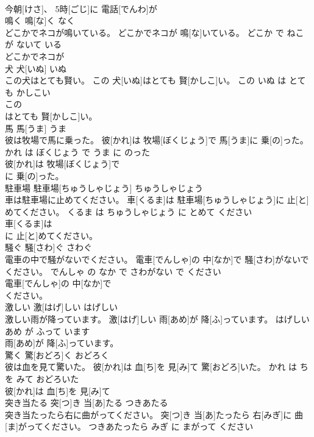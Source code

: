 \documentclass[8pt]{extreport}
\begin{document}
\begin{CJK}{UTF8}{min}
\\	今朝[けさ]、 5時[ごじ]に 電話[でんわ]が
\\	鳴く	鳴[な]く	なく	
\\	どこかでネコが鳴いている。	どこかでネコが 鳴[な]いている。	どこか で ねこ が ないて いる	
\\	どこかでネコが
\\	犬	犬[いぬ]	いぬ	
\\	この犬はとても賢い。	この 犬[いぬ]はとても 賢[かしこ]い。	この いぬ は とても かしこい	
\\	この
\\	はとても 賢[かしこ]い。			
\\	馬	馬[うま]	うま	
\\	彼は牧場で馬に乗った。	彼[かれ]は 牧場[ぼくじょう]で 馬[うま]に 乗[の]った。	かれ は ぼくじょう で うま に のった	
\\	彼[かれ]は 牧場[ぼくじょう]で
\\	に 乗[の]った。			
\\	駐車場	駐車場[ちゅうしゃじょう]	ちゅうしゃじょう	
\\	車は駐車場に止めてください。	車[くるま]は 駐車場[ちゅうしゃじょう]に 止[と]めてください。	くるま は ちゅうしゃじょう に とめて ください	
\\	車[くるま]は
\\	に 止[と]めてください。			
\\	騒ぐ	騒[さわ]ぐ	さわぐ	
\\	電車の中で騒がないでください。	電車[でんしゃ]の 中[なか]で 騒[さわ]がないでください。	でんしゃ の なか で さわがない で ください	
\\	電車[でんしゃ]の 中[なか]で
\\	ください。			
\\	激しい	激[はげ]しい	はげしい	
\\	激しい雨が降っています。	激[はげ]しい 雨[あめ]が 降[ふ]っています。	はげしい あめ が ふって います	
\\	雨[あめ]が 降[ふ]っています。			
\\	驚く	驚[おどろ]く	おどろく	
\\	彼は血を見て驚いた。	彼[かれ]は 血[ち]を 見[み]て 驚[おどろ]いた。	かれ は ち を みて おどろいた	
\\	彼[かれ]は 血[ち]を 見[み]て
\\	突き当たる	突[つ]き 当[あ]たる	つきあたる	
\\	突き当たったら右に曲がってください。	突[つ]き 当[あ]たったら 右[みぎ]に 曲[ま]がってください。	つきあたったら みぎ に まがって ください	

\end{CJK}
\end{document}
